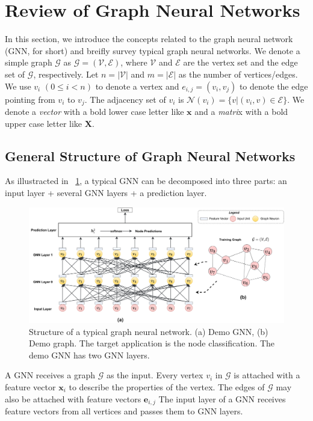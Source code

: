 \section{Review of Graph Neural Networks}

In this section, we introduce the concepts related to the graph neural network (GNN, for short) and breifly survey typical graph neural networks.
We denote a simple graph $\mathcal{G}$ as $\mathcal{G}=(\mathcal{V}, \mathcal{E})$, where $\mathcal{V}$ and $\mathcal{E}$ are the vertex set and the edge set of $\mathcal{G}$, respectively.
Let $n=|\mathcal{V}|$ and $m=|\mathcal{E}|$ as the number of vertices/edges. 
We use $v_i$ $(0 \leq i < n)$ to denote a vertex and $e_{i,j}=(v_i, v_j)$ to denote the edge pointing from $v_i$ to $v_j$.
The adjacency set of $v_i$ is $\mathcal{N}(v_i)=\{v|(v_i, v) \in \mathcal{E}\}$.
We denote a \emph{vector} with a bold lower case letter like $\boldsymbol{x}$ and a \emph{matri}x with a bold upper case letter like $\boldsymbol{X}$.

\subsection{General Structure of Graph Neural Networks}

As illustracted in \figurename~\ref{fig:general_structure_of_gnn}, a typical GNN can be decomposed into three parts: an input layer + several GNN layers + a prediction layer.

\begin{figure}
	\centering
	\includegraphics[width=1.1\columnwidth]{figs/illustration/GNN_common_architecture.png}
	\caption{Structure of a typical graph neural network. (a) Demo GNN, (b) Demo graph. The target application is the node classification. The demo GNN has two GNN layers.}
	\label{fig:general_structure_of_gnn}
\end{figure}

A GNN receives a graph $\mathcal{G}$ as the input.
Every vertex $v_i$ in $\mathcal{G}$ is attached with a feature vector $\boldsymbol{x}_i$ to describe the properties of the vertex.
The edges of $\mathcal{G}$ may also be attached with feature vectors $\boldsymbol{e}_{i,j}$
The input layer of a GNN receives feature vectors from all vertices and passes them to GNN layers.

